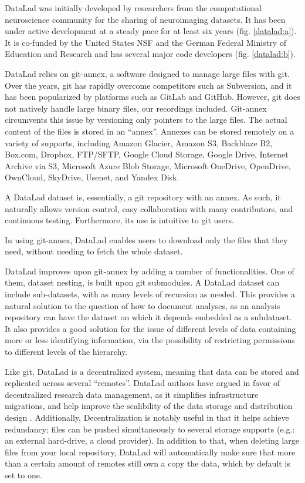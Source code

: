\documentclass[smallextended]{svjour3}       %
\begin{document}
DataLad \citep{datalad_handbook} was initially developed by researchers from the computational neuroscience community for the sharing of neuroimaging datasets. It has been under active development at a steady pace for at least six years (fig. \ref{datalad:a}). It is co-funded by the United States NSF and the German Federal Ministry of Education and Research and has several major code developers (fig. \ref{datalad:b}).%

DataLad relies on git-annex, a software designed to manage large files with git. Over the years, git has rapidly overcome competitors such as Subversion, and it has been popularized by platforms such as GitLab and GitHub. However, git does not natively handle large binary files, our recordings included. Git-annex circumvents this issue by versioning only pointers to the large files. The actual content of the files is stored in an ``annex''. Annexes can be stored remotely on a variety of supports, including Amazon Glacier, Amazon S3, Backblaze B2, Box.com, Dropbox, FTP/SFTP, Google Cloud Storage, Google Drive, Internet Archive via S3, Microsoft Azure Blob Storage, Microsoft OneDrive, OpenDrive, OwnCloud, SkyDrive, Usenet, and Yandex Disk.

A DataLad dataset is, essentially, a git repository with an annex. As such, it naturally allows version control, easy collaboration with many contributors, and continuous testing. Furthermore, its use is intuitive to git users.

In using git-annex, DataLad enables users to download only the files that they need, without needing to fetch the whole dataset.

DataLad improves upon git-annex by adding a number of functionalities. One of them, dataset nesting, is built upon git submodules. A DataLad dataset can include sub-datasets, with as many levels of recursion as needed. This provides a natural solution to the question of how to document analyses, as an analysis repository can have the dataset on which it depends embedded as a subdataset. It also provides a good solution for the issue of different levels of data containing more or less identifying information, via the possibility of restricting permissions to different levels of the hierarchy.

Like git, DataLad is a decentralized system, meaning that data can be stored and replicated across several ``remotes''. DataLad authors have argued in favor of decentralized research data management, as it simplifies infrastructure migrations, and help improve the scalibility of the data storage and distribution design \cite{decentralization_hanke}. Additionally, Decentralization is notably useful in that it helps achieve redundancy; files can be pushed simultaneously to several storage supports (e.g.: an external hard-drive, a cloud provider). In addition to that, when deleting large files from your local repository, DataLad will automatically make sure that more than a certain amount of remotes still own a copy the data, which by default is set to one.
\end{document}
